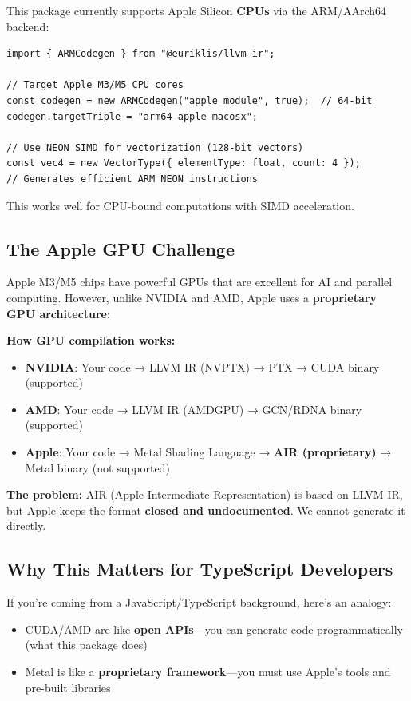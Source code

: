\documentclass[11pt]{article}
\begin{document}
This package currently supports Apple Silicon \textbf{CPUs} via the ARM/AArch64 backend:

\begin{lstlisting}[style=ts]
import { ARMCodegen } from "@euriklis/llvm-ir";

// Target Apple M3/M5 CPU cores
const codegen = new ARMCodegen("apple_module", true);  // 64-bit
codegen.targetTriple = "arm64-apple-macosx";

// Use NEON SIMD for vectorization (128-bit vectors)
const vec4 = new VectorType({ elementType: float, count: 4 });
// Generates efficient ARM NEON instructions
\end{lstlisting}

This works well for CPU-bound computations with SIMD acceleration.

\subsection{The Apple GPU Challenge}

Apple M3/M5 chips have powerful GPUs that are excellent for AI and parallel computing. However, unlike NVIDIA and AMD, Apple uses a \textbf{proprietary GPU architecture}:

\textbf{How GPU compilation works:}

\begin{itemize}[noitemsep]
  \item \textbf{NVIDIA}: Your code → LLVM IR (NVPTX) → PTX → CUDA binary (supported)
  \item \textbf{AMD}: Your code → LLVM IR (AMDGPU) → GCN/RDNA binary (supported)
  \item \textbf{Apple}: Your code → Metal Shading Language\cite{metalspec} → \textbf{AIR (proprietary)} → Metal binary (not supported)
\end{itemize}

\textbf{The problem:} AIR (Apple Intermediate Representation) is based on LLVM IR, but Apple keeps the format \textbf{closed and undocumented}\cite{airformat}. We cannot generate it directly.

\subsection{Why This Matters for TypeScript Developers}

If you're coming from a JavaScript/TypeScript background, here's an analogy:

\begin{itemize}[noitemsep]
  \item CUDA/AMD are like \textbf{open APIs}—you can generate code programmatically (what this package does)
  \item Metal is like a \textbf{proprietary framework}—you must use Apple's tools and pre-built libraries
\end{itemize}
\end{document}
